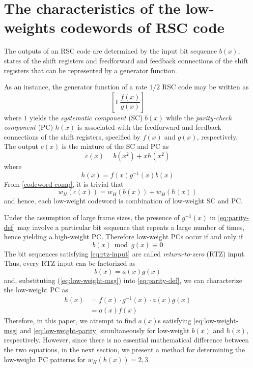 \section{The characteristics of the low-weights codewords of RSC code}
\label{sec2}
The outputs of an RSC code are determined by the input bit sequence $b(x)$, states of the shift registers and feedforward and feedback connections of the shift registers that can be represented by a generator function. 

As an instance,  the generator function of a rate $1/2$ RSC code may be written as  $$\left[1 ~\frac{f(x)}{g(x)}\right]$$ where $1$ yields the \textit{systematic  component} (SC) $b(x)$ while the \textit{parity-check component} (PC) $h(x)$ is associated with the feedforward and feedback connections of the shift registers, specified by $f(x)$ and $g(x)$, respectively. The output $c(x)$ is the mixture of the SC and PC as
\begin{equation}
c(x) = b(x^2)+xh(x^2)
\label{codeword-comp}
\end{equation}
where 
\begin{equation}
h(x) =f(x)g^{-1}(x)b(x)
\label{eq:parity-def}
\end{equation}
From \eqref{codeword-comp}, it is trivial that
\begin{equation}
w_H(c(x))=w_H(b(x)) + w_H(h(x))
\label{eq:cw-weight}
\end{equation}
and hence, each low-weight codeword is combination of low-weight SC and PC.

Under the assumption of large frame sizes, the presence of $g^{-1}(x)$  in \eqref{eq:parity-def} may involve a particular bit sequence that repeats a large number of times, hence yielding a high-weight PC. Therefore low-weight PCs occur if and only if
\begin{equation}
b(x) \bmod g(x) \equiv 0
\label{eq:rtz-input}
\end{equation}
The bit sequences satisfying \eqref{eq:rtz-input} are called \textit{return-to-zero} (RTZ) input. Thus, every RTZ input can be factorized as  
\begin{equation}
b(x) =a(x)g(x)
\label{eq:low-weight-msg}
\end{equation}
and, substituting (\ref{eq:low-weight-msg}) into \eqref{eq:parity-def}, we can characterize the low-weight PC as
\begin{equation}
\begin{split}
h(x)&=f(x)\cdot g^{-1}(x)\cdot a(x)g(x)\\
&=a(x)f(x)
\end{split}
\label{eq:low-weight-parity}
\end{equation}
Therefore, in this paper, we attempt to find $a(x)$s satisfying  \eqref{eq:low-weight-msg} and  \eqref{eq:low-weight-parity} simultaneously for low-weight $b(x)$ and $h(x)$, respectively. 
%
However, since there is no essential mathematical difference between the two equations, in the next section, we present a method for determining the low-weight PC patterns for $w_H(h(x))= 2,3$.